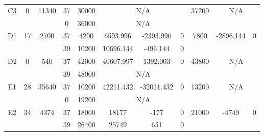 \begin{sidewaystable}
\begin{tabular}{c||c|c||c|c|c|c|c||c|c|c}
         &
        
      \\
      \hline
      \multirow{2}{*}{C3} &
      \multirow{2}{*}{0} &
      \multirow{2}{*}{11340} &
      37 &
      30000 &
        \multicolumn{3}{|c||}{N/A} &
      \multirow{2}{*}{37200} &
        \multicolumn{2}{c}{\multirow{2}{*}{N/A}}
      \\
      \cline{4-8}
       &
       &
       &
      0 &
      36000 &
        \multicolumn{3}{|c||}{N/A} &
      
        
      \\
      \hline
      \multirow{2}{*}{D1} &
      \multirow{2}{*}{17} &
      \multirow{2}{*}{2700} &
      37 &
      4200 &
        6593.996 &
        -2393.996 &
        0 &
      \multirow{2}{*}{7800} &
        \multirow{2}{*}{-2896.144} &
        \multirow{2}{*}{0}
      \\
      \cline{4-8}
       &
       &
       &
      39 &
      10200 &
        10696.144 &
        -496.144 &
        0 &
      
         &
        
      \\
      \hline
      \multirow{2}{*}{D2} &
      \multirow{2}{*}{0} &
      \multirow{2}{*}{540} &
      37 &
      42000 &
        40607.997 &
        1392.003 &
        0 &
      \multirow{2}{*}{43800} &
        \multicolumn{2}{c}{\multirow{2}{*}{N/A}}
      \\
      \cline{4-8}
       &
       &
       &
      39 &
      48000 &
        \multicolumn{3}{|c||}{N/A} &
      
        
      \\
      \hline
      \multirow{2}{*}{E1} &
      \multirow{2}{*}{28} &
      \multirow{2}{*}{35640} &
      37 &
      10200 &
        42211.432 &
        -32011.432 &
        0 &
      \multirow{2}{*}{13200} &
        \multicolumn{2}{c}{\multirow{2}{*}{N/A}}
      \\
      \cline{4-8}
       &
       &
       &
      0 &
      19200 &
        \multicolumn{3}{|c||}{N/A} &
      
        
      \\
      \hline
      \multirow{2}{*}{E2} &
      \multirow{2}{*}{34} &
      \multirow{2}{*}{4374} &
      37 &
      18000 &
        18177 &
        -177 &
        0 &
      \multirow{2}{*}{21000} &
        \multirow{2}{*}{-4749} &
        \multirow{2}{*}{0}
      \\
      \cline{4-8}
       &
       &
       &
      39 &
      26400 &
        25749 &
        651 &
        0 &
      

\end{tabular}
\end{sidewaystable}
